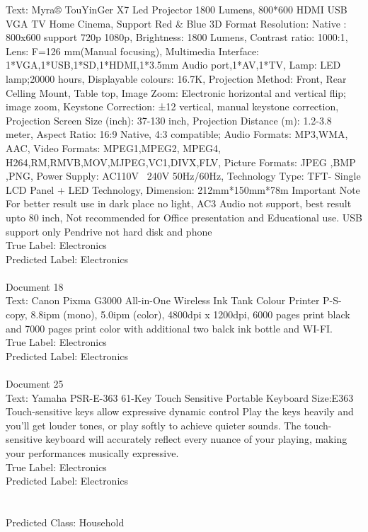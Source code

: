 \documentclass[a4paper,12pt]{article}
\begin{document}
{Text: Myra® TouYinGer X7 Led Projector 1800 Lumens, 800*600 HDMI USB VGA TV Home Cinema, Support Red \& Blue 3D Format Resolution: Native : 800x600 support 720p 1080p, Brightness: 1800 Lumens, Contrast ratio: 1000:1, Lens: F=126 mm(Manual focusing), Multimedia Interface: 1*VGA,1*USB,1*SD,1*HDMI,1*3.5mm Audio port,1*AV,1*TV, Lamp: LED lamp;20000 hours, Displayable colours: 16.7K, Projection Method: Front, Rear Celling Mount, Table top, Image Zoom: Electronic horizontal and vertical flip; image zoom, Keystone Correction: ±12 vertical, manual keystone correction, Projection Screen Size (inch): 37-130 inch, Projection Distance (m): 1.2-3.8 meter, Aspect Ratio: 16:9 Native, 4:3 compatible; Audio Formats: MP3,WMA, AAC, Video Formats: MPEG1,MPEG2, MPEG4, H264,RM,RMVB,MOV,MJPEG,VC1,DIVX,FLV, Picture Formats: JPEG ,BMP ,PNG, Power Supply: AC110V~ 240V 50Hz/60Hz, Technology Type: TFT- Single LCD Panel + LED Technology, Dimension: 212mm*150mm*78m Important Note For better result use in dark place no light, AC3 Audio not support, best result upto 80 inch, Not recommended for Office presentation and Educational use. USB support only Pendrive not hard disk and phone\\
True Label: Electronics\\
Predicted Label: Electronics\\
\\ Document 18\\
Text: Canon Pixma G3000 All-in-One Wireless Ink Tank Colour Printer P-S-copy, 8.8ipm (mono), 5.0ipm (color), 4800dpi x 1200dpi, 6000 pages print black and 7000 pages print color with additional two balck ink bottle and WI-FI.\\
True Label: Electronics\\
Predicted Label: Electronics\\
\\ Document 25\\
Text: Yamaha PSR-E-363 61-Key Touch Sensitive Portable Keyboard Size:E363   Touch-sensitive keys allow expressive dynamic control Play the keys heavily and you'll get louder tones, or play softly to achieve quieter sounds. The touch-sensitive keyboard will accurately reflect every nuance of your playing, making your performances musically expressive.\\
True Label: Electronics\\
Predicted Label: Electronics\\
\\\\ Predicted Class: Household\\
}
\end{document}
